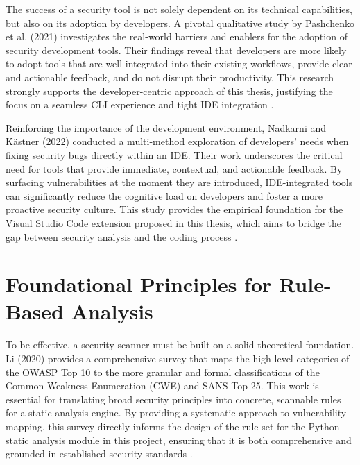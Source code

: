 The success of a security tool is not solely dependent on its technical capabilities, but also on its adoption by developers. A pivotal qualitative study by Pashchenko et al. (2021) investigates the real-world barriers and enablers for the adoption of security development tools. Their findings reveal that developers are more likely to adopt tools that are well-integrated into their existing workflows, provide clear and actionable feedback, and do not disrupt their productivity. This research strongly supports the developer-centric approach of this thesis, justifying the focus on a seamless CLI experience and tight IDE integration \cite{pashchenko2021qualitative}.

Reinforcing the importance of the development environment, Nadkarni and Kästner (2022) conducted a multi-method exploration of developers' needs when fixing security bugs directly within an IDE. Their work underscores the critical need for tools that provide immediate, contextual, and actionable feedback. By surfacing vulnerabilities at the moment they are introduced, IDE-integrated tools can significantly reduce the cognitive load on developers and foster a more proactive security culture. This study provides the empirical foundation for the Visual Studio Code extension proposed in this thesis, which aims to bridge the gap between security analysis and the coding process \cite{nadkarni2022fixing}.

\section{Foundational Principles for Rule-Based Analysis}

To be effective, a security scanner must be built on a solid theoretical foundation. Li (2020) provides a comprehensive survey that maps the high-level categories of the OWASP Top 10 to the more granular and formal classifications of the Common Weakness Enumeration (CWE) and SANS Top 25. This work is essential for translating broad security principles into concrete, scannable rules for a static analysis engine. By providing a systematic approach to vulnerability mapping, this survey directly informs the design of the rule set for the Python static analysis module in this project, ensuring that it is both comprehensive and grounded in established security standards \cite{li2020vulnerabilities}.